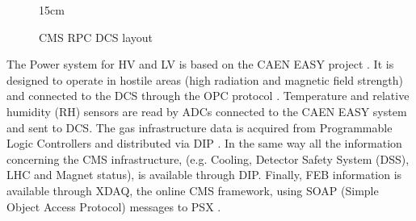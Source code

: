 \begin{figure}[!htm]{15cm}
\caption{CMS RPC DCS layout}%
\label{fig:RPC_DCS_layout}
\end{figure}

The Power system for HV and LV is based on the CAEN EASY project \cite{CAENEASY}. It is designed to operate in hostile areas (high radiation and magnetic field strength) and connected to the DCS through the OPC protocol \cite{OPCFoundation}.  Temperature and relative humidity (RH) sensors are read by ADCs connected to the CAEN EASY system and sent to DCS. The gas infrastructure data is acquired from Programmable Logic Controllers and distributed via DIP \cite{Barillere:2003fi}. In the same way all the information concerning the CMS infrastructure, (e.g. Cooling, Detector Safety System (DSS), LHC and Magnet status), is available through DIP. Finally, FEB information is available through XDAQ, the online CMS framework, using SOAP (Simple Object Access Protocol)  messages to PSX \cite{gutleber2002software}.

